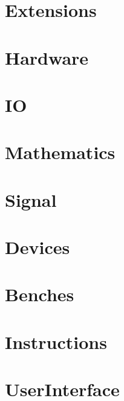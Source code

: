 \documentclass{article}
\begin{document}
	\newpage
	
	\section{Extensions} \label{section:Extensions}
	
	\newpage
	
	\section{Hardware} \label{section:Hardware}
	
	\newpage
	
	\section{IO} \label{section:IO}
	
	\newpage
	
	\section{Mathematics} \label{section:Mathematics}
	
	\newpage
	
	\section{Signal} \label{section:Signal}
	
	\newpage
	
	\section{Devices} \label{section:Devices}
	
	\newpage
	
	\section{Benches} \label{section:Benches}
	
	\newpage
	
	\section{Instructions} \label{section:Instructions}
	
	\newpage
	
	\section{UserInterface} \label{section:UserInterface}
		
\end{document}

